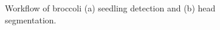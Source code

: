 \begin{figure}[htb]
  \begin{center}
  \end{center}
  \caption[Workflow of broccoli seedling detection and head segmentation]{
    Workflow of broccoli (a) seedling detection and (b) head segmentation.
  }
  \label{fig:cp4.6}
\end{figure}